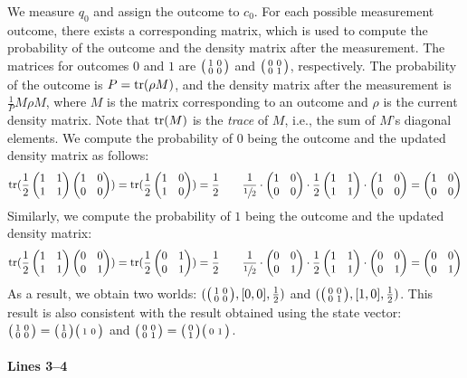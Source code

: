 We measure $q_0$ and assign the outcome to $c_0$.
%
For each possible measurement outcome, there exists a corresponding matrix,
which is used to compute the probability of the outcome and the density matrix
after the measurement.
%
The matrices for outcomes $0$ and $1$ are $\big(\begin{smallmatrix}1&0\\0&0\end{smallmatrix}\big)$ and
$\big(\begin{smallmatrix}0&0\\0&1\end{smallmatrix}\big)$, respectively.
%
The probability of the outcome is $P=\textrm{tr}(\rho M)$, and the density matrix
after the measurement is $\frac{1}{P}M\rho M$, where $M$ is the matrix
corresponding to an outcome and $\rho$ is the current density matrix.
%
Note that $\textrm{tr}(M)$ is the \emph{trace} of $M$, i.e., the sum of $M$'s
diagonal elements.
%
We compute the probability of $0$ being the outcome and the updated density
matrix as follows:
%
\[
	\textrm{tr}(\frac{1}{2}\begin{pmatrix}1&1\\1&1\end{pmatrix}\begin{pmatrix}1&0\\0&0\end{pmatrix})
	=\textrm{tr}(\frac{1}{2}\begin{pmatrix}1&0\\1&0\end{pmatrix})
	=\frac{1}{2}
	\qquad
	\frac{1}{\sfrac{1}{2}}\cdot\begin{pmatrix}1&0\\0&0\end{pmatrix}\cdot\frac{1}{2}\begin{pmatrix}1&1\\1&1\end{pmatrix}\cdot\begin{pmatrix}1&0\\0&0\end{pmatrix}
	=\begin{pmatrix}1&0\\0&0\end{pmatrix}
\]
%
Similarly, we compute the probability of $1$ being the outcome and the updated
density matrix:
%
\[
	\textrm{tr}(\frac{1}{2}\begin{pmatrix}1&1\\1&1\end{pmatrix}\begin{pmatrix}0&0\\0&1\end{pmatrix})
	=\textrm{tr}(\frac{1}{2}\begin{pmatrix}0&1\\0&1\end{pmatrix})
	=\frac{1}{2}
	\qquad
	\frac{1}{\sfrac{1}{2}}\cdot\begin{pmatrix}0&0\\0&1\end{pmatrix}\cdot\frac{1}{2}\begin{pmatrix}1&1\\1&1\end{pmatrix}\cdot\begin{pmatrix}0&0\\0&1\end{pmatrix}
	=\begin{pmatrix}0&0\\0&1\end{pmatrix}
\]
%
As a result, we obtain two worlds: $(\big(\begin{smallmatrix}1&0\\0&0\end{smallmatrix}\big),[0,0],\frac{1}{2})$ and
$(\big(\begin{smallmatrix}0&0\\0&1\end{smallmatrix}\big),[1,0],\frac{1}{2})$.
%
This result is also consistent with the result obtained using the state vector:
%
$\big(\begin{smallmatrix}1&0\\0&0\end{smallmatrix}\big)=\big(\begin{smallmatrix}1\\0\end{smallmatrix}\big)\big(\begin{smallmatrix}1&0\end{smallmatrix}\big)$ and
$\big(\begin{smallmatrix}0&0\\0&1\end{smallmatrix}\big)=\big(\begin{smallmatrix}0\\1\end{smallmatrix}\big)\big(\begin{smallmatrix}0&1\end{smallmatrix}\big)$.

\paragraph{Lines 3--4}

